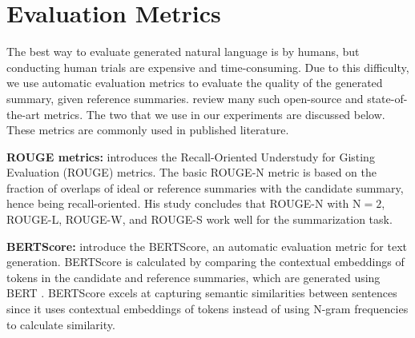 \section{Evaluation Metrics}
\label{sec:metrics}

The best way to evaluate generated natural language is by humans, but conducting human trials are expensive and time-consuming.
Due to this difficulty, we use automatic evaluation metrics to evaluate the quality of the generated summary, given reference summaries.
\citet{fabbri2021summeval} review many such open-source and state-of-the-art metrics.
The two that we use in our experiments are discussed below.
These metrics are commonly used in published literature.

\textbf{ROUGE metrics:} \citet{lin-2004-rouge} introduces the Recall-Oriented Understudy for Gisting Evaluation (ROUGE) metrics.
The basic ROUGE-N metric is based on the fraction of overlaps of ideal or reference summaries with the candidate summary, hence being recall-oriented.
His study concludes that ROUGE-N with $\text{N} = 2$, ROUGE-L, ROUGE-W, and ROUGE-S work well for the summarization task.

\textbf{BERTScore:} \citet{zhang2019bertscore} introduce the BERTScore, an automatic evaluation metric for text generation.
BERTScore is calculated by comparing the contextual embeddings of tokens in the candidate and reference summaries, which are generated using BERT \cite{devlin2018bert}.
BERTScore excels at capturing semantic similarities between sentences since it uses contextual embeddings of tokens instead of using N-gram frequencies to calculate similarity.

